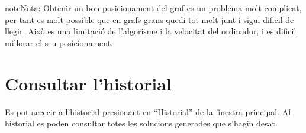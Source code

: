 \documentclass[letterpaper,10pt,oneside]{sphinxmanual}
\begin{document}
\begin{notice}{note}{Nota:}
Obtenir un bon posicionament del graf es un problema molt complicat, per tant es molt possible que en grafs grans quedi tot molt junt i sigui dificil de llegir. Això es una limitació de l'algorisme i la velocitat del ordinador, i es dificil millorar el seu posicionament.
\end{notice}


\chapter{Consultar l'historial}
\label{consult_hist:consultar-l-historial}\label{consult_hist::doc}
Es pot accecir a l'historial presionant en ``Historial'' de la finestra principal.
Al historial es poden consultar totes les solucions generades que s'hagin desat.
\end{document}
